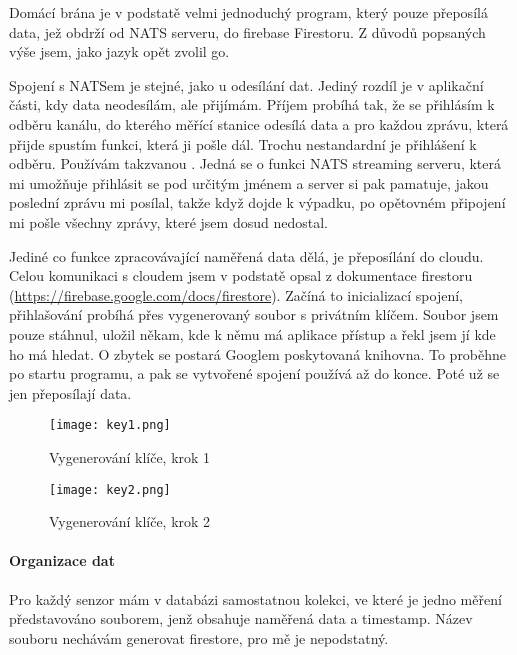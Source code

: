 Domácí brána je v podstatě velmi jednoduchý program, který pouze přeposílá data, jež obdrží od NATS serveru, do 
\gls{firebase} Firestoru. Z důvodů popsaných výše jsem, jako jazyk opět zvolil \gls{go}.


Spojení s NATSem je stejné, jako u odesílání dat. Jediný rozdíl je v aplikační části, kdy data neodesílám, ale přijímám. 
Příjem probíhá tak, že se přihlásím k odběru kanálu, do kterého měřící stanice odesílá data a pro každou zprávu, která 
přijde spustím funkci, která ji pošle dál. Trochu nestandardní je přihlášení k odběru. Používám takzvanou . Jedná se o funkci NATS streaming serveru, která mi umožňuje přihlásit se pod určitým jménem a server si 
pak pamatuje, jakou poslední zprávu mi posílal, takže když dojde k výpadku, po opětovném připojení mi pošle všechny 
zprávy, které jsem dosud nedostal.

Jediné co funkce zpracovávající naměřená data dělá, je přeposílání do cloudu. Celou komunikaci s cloudem jsem v podstatě 
opsal z dokumentace firestoru (\url{https://firebase.google.com/docs/firestore}). Začíná to inicializací spojení, 
přihlašování probíhá přes vygenerovaný soubor s privátním klíčem. Soubor jsem pouze stáhnul, uložil někam, kde k němu má 
aplikace přístup a řekl jsem jí kde ho má hledat. O zbytek se postará Googlem poskytovaná \gls{knihovna}. To proběhne po 
startu programu, a pak se vytvořené spojení používá až do konce. Poté už se jen přeposílají data.

\begin{figure}[H]
    \centering
    \texttt{[image: key1.png]}
    \caption{Vygenerování klíče, krok 1}
\end{figure}
\begin{figure}[H]
    \centering
    \texttt{[image: key2.png]}
    \caption{Vygenerování klíče, krok 2}
\end{figure}

\paragraph*{Organizace dat}
Pro každý senzor mám v databázi samostatnou kolekci, ve které je jedno měření představováno souborem, jenž obsahuje 
naměřená data a \gls{timestamp}. Název souboru nechávám generovat firestore, pro mě je nepodstatný.
